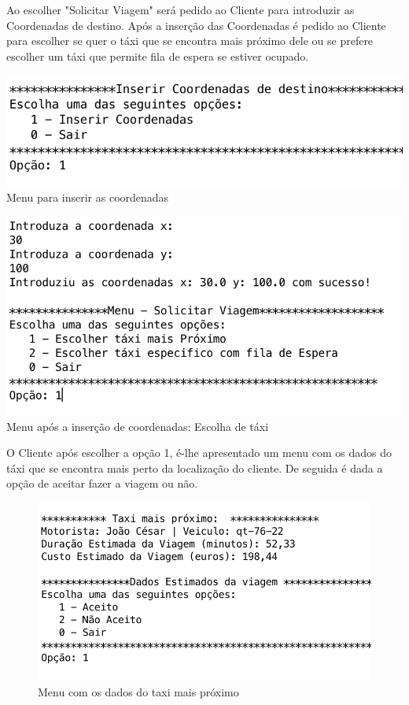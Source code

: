 Ao escolher "Solicitar Viagem" será pedido ao Cliente para introduzir as Coordenadas de destino. Após a inserção das Coordenadas é pedido ao Cliente para escolher se quer o táxi que se encontra mais próximo dele ou se prefere escolher um táxi que permite fila de espera se estiver ocupado. 

\noindent\begin{minipage}[b]{.5\textwidth}
	\includegraphics[scale=0.55]{imagem/inserirDestino}
	\small{Menu para inserir as coordenadas}
\end{minipage} 
\hfill
\begin{minipage}[b]{.5\textwidth}
	\includegraphics[scale=0.6]{imagem/coorInseridas}
	\small{Menu após a inserção de coordenadas: Escolha de táxi}
\end{minipage}
\hfill


O Cliente após escolher a opção 1, é-lhe apresentado um menu com os dados do táxi que se encontra mais perto da localização do cliente. De seguida é dada a opção de aceitar fazer a viagem ou não. 
\begin{figure}[htpb]
	\centering
	\includegraphics[scale=0.6]{imagem/taxiMaisProx}
	\caption{Menu com os dados do taxi mais próximo }
	\label{p3:fig:p3_taxiMaisProx}
\end{figure}

